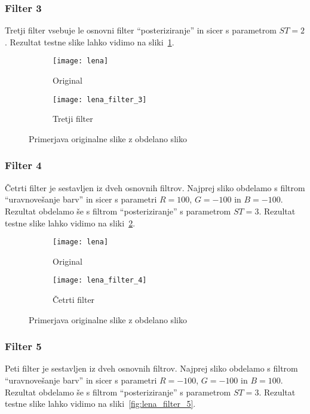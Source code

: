 \subsubsection*{Filter 3}
Tretji filter vsebuje le osnovni filter ``posteriziranje'' in sicer s parametrom
$ST = 2$. Rezultat testne slike lahko vidimo na sliki~\ref{fig:lena_filter_3}.

\begin{figure}[!ht]
    \centering
    \begin{subfigure}[b]{0.4\textwidth}
        \texttt{[image: lena]}
        \caption{Original}
    \end{subfigure}
    \begin{subfigure}[b]{0.4\textwidth}
        \texttt{[image: lena\_filter\_3]}
        \caption{Tretji filter}
    \end{subfigure}
    \caption{Primerjava originalne slike z obdelano sliko}
    \label{fig:lena_filter_3}
\end{figure}


\subsubsection*{Filter 4}
Četrti filter je sestavljen iz dveh osnovnih filtrov. Najprej sliko obdelamo s
filtrom ``uravnovešanje barv'' in sicer s parametri $R = 100$, $G = -100$ in
$B = -100$. Rezultat obdelamo še s filtrom ``posteriziranje'' s parametrom
$ST = 3$. Rezultat testne slike lahko vidimo na sliki~\ref{fig:lena_filter_4}.

\begin{figure}[!ht]
    \centering
    \begin{subfigure}[b]{0.4\textwidth}
        \texttt{[image: lena]}
        \caption{Original}
    \end{subfigure}
    \begin{subfigure}[b]{0.4\textwidth}
        \texttt{[image: lena\_filter\_4]}
        \caption{Četrti filter}
    \end{subfigure}
    \caption{Primerjava originalne slike z obdelano sliko}
    \label{fig:lena_filter_4}
\end{figure}


\subsubsection*{Filter 5}
Peti filter je sestavljen iz dveh osnovnih filtrov. Najprej sliko obdelamo s
filtrom ``uravnovešanje barv'' in sicer s parametri $R = -100$, $G = -100$ in
$B = 100$. Rezultat obdelamo še s filtrom ``posteriziranje'' s parametrom
$ST = 3$. Rezultat testne slike lahko vidimo na sliki~\ref{fig:lena_filter_5}.

